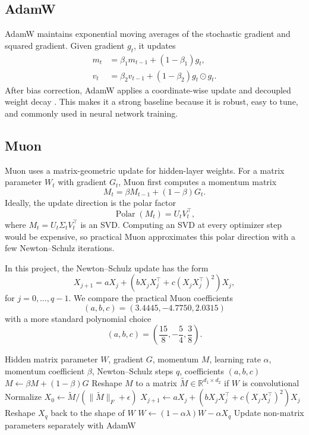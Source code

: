 \documentclass{article}
\begin{document}
\subsection{AdamW}

AdamW maintains exponential moving averages of the stochastic gradient and squared gradient. Given gradient $g_t$, it updates
\begin{align}
m_t &= \beta_1 m_{t-1} + (1-\beta_1)g_t,\\
v_t &= \beta_2 v_{t-1} + (1-\beta_2)g_t \odot g_t.
\end{align}
After bias correction, AdamW applies a coordinate-wise update and decoupled weight decay \citep{loshchilov2019decoupled}. This makes it a strong baseline because it is robust, easy to tune, and commonly used in neural network training.

\subsection{Muon}

Muon uses a matrix-geometric update for hidden-layer weights. For a matrix parameter $W_t$ with gradient $G_t$, Muon first computes a momentum matrix
\begin{equation}
M_t = \beta M_{t-1} + (1-\beta)G_t.
\end{equation}
Ideally, the update direction is the polar factor
\begin{equation}
\operatorname{Polar}(M_t) = U_t V_t^\top,
\end{equation}
where $M_t = U_t \Sigma_t V_t^\top$ is an SVD. Computing an SVD at every optimizer step would be expensive, so practical Muon approximates this polar direction with a few Newton--Schulz iterations.

In this project, the Newton--Schulz update has the form
\begin{equation}
X_{j+1} = aX_j + \left(bX_jX_j^\top + c(X_jX_j^\top)^2\right)X_j,
\label{eq:ns}
\end{equation}
for $j=0,\ldots,q-1$. We compare the practical Muon coefficients
\[
(a,b,c)=(3.4445,-4.7750,2.0315)
\]
with a more standard polynomial choice
\[
(a,b,c)=\left(\frac{15}{8},-\frac{5}{4},\frac{3}{8}\right).
\]

\begin{algorithm}[t]
\caption{Muon optimizer step}
\label{alg:muon}
\begin{algorithmic}[1]
\REQUIRE Hidden matrix parameter $W$, gradient $G$, momentum $M$, learning rate $\alpha$, momentum coefficient $\beta$, Newton--Schulz steps $q$, coefficients $(a,b,c)$
\STATE $M \leftarrow \beta M + (1-\beta)G$
\STATE Reshape $M$ to a matrix $\tilde M\in\mathbb{R}^{d_1\times d_2}$ if $W$ is convolutional
\STATE Normalize $X_0 \leftarrow \tilde M / (\|\tilde M\|_F+\epsilon)$
\STATE $X_{j+1} \leftarrow aX_j + (bX_jX_j^\top+c(X_jX_j^\top)^2)X_j$
\ENDFOR
\STATE Reshape $X_q$ back to the shape of $W$
\STATE $W \leftarrow (1-\alpha\lambda)W - \alpha X_q$
\STATE Update non-matrix parameters separately with AdamW
\end{algorithmic}
\end{algorithm}
\end{document}
